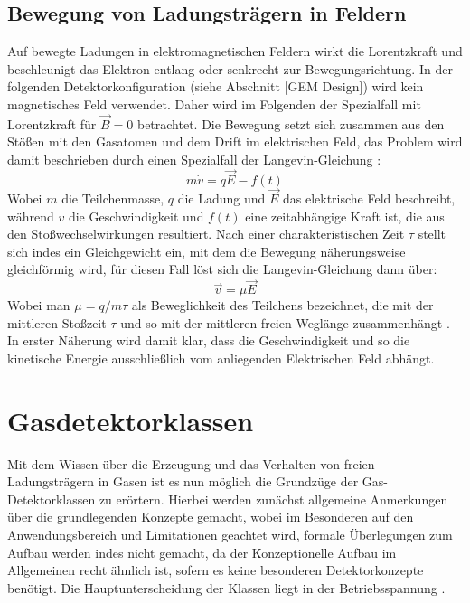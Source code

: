 		\subsection{Bewegung von Ladungsträgern in Feldern}\label{sec:Bewegung in Feldern}
		Auf bewegte Ladungen in elektromagnetischen Feldern wirkt die Lorentzkraft und beschleunigt das Elektron entlang oder senkrecht zur Bewegungsrichtung. In der folgenden Detektorkonfiguration (siehe Abschnitt [GEM Design]) wird kein magnetisches Feld verwendet. Daher wird im Folgenden der Spezialfall mit Lorentzkraft für $\vec{B}=0$ betrachtet. Die Bewegung setzt sich zusammen aus den Stößen mit den Gasatomen und dem Drift im elektrischen Feld, das Problem wird damit beschrieben durch einen Spezialfall der Langevin-Gleichung \cite{Schwabl}:
		\begin{equation*}
			m \dot{v}= q \vec{E}- f(t)
		\end{equation*}
		Wobei $m$ die Teilchenmasse, $q$ die Ladung und $\vec{E}$ das elektrische Feld beschreibt, während $v$ die Geschwindigkeit und $f(t)$ eine zeitabhängige Kraft ist, die aus den Stoßwechselwirkungen resultiert. Nach einer charakteristischen Zeit $\tau$ stellt sich indes ein Gleichgewicht ein, mit dem die Bewegung näherungsweise gleichförmig wird, für diesen Fall löst sich die Langevin-Gleichung dann über:
		\begin{equation*}
			\vec{v}= \mu \vec{E}
		\end{equation*}
		Wobei man $\mu=q/m \tau$ als Beweglichkeit des Teilchens bezeichnet, die mit der mittleren Stoßzeit $\tau$ und so mit der mittleren freien Weglänge zusammenhängt \cite{ottnad}. In erster Näherung wird damit klar, dass die Geschwindigkeit und so die kinetische Energie ausschließlich vom anliegenden Elektrischen Feld abhängt.
		
		\newpage
	\section{Gasdetektorklassen}
		Mit dem Wissen über die Erzeugung und das Verhalten von freien Ladungsträgern in Gasen ist es nun möglich die Grundzüge der Gas-Detektorklassen zu erörtern. Hierbei werden zunächst allgemeine Anmerkungen über die grundlegenden Konzepte gemacht, wobei im Besonderen auf den Anwendungsbereich und Limitationen geachtet wird, formale Überlegungen zum Aufbau werden indes nicht gemacht, da der Konzeptionelle Aufbau im Allgemeinen recht ähnlich ist, sofern es keine besonderen Detektorkonzepte benötigt. Die Hauptunterscheidung der Klassen liegt in der Betriebsspannung \cite{Leo}.
		
